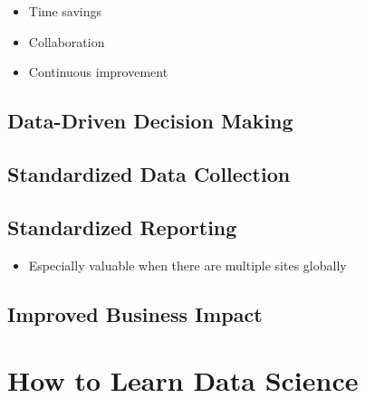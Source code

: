 \documentclass[
]{book}
\providecommand{\tightlist}{%
  \setlength{\itemsep}{0pt}\setlength{\parskip}{0pt}}
\begin{document}
\begin{itemize}
\tightlist
\item
  Time savings
\item
  Collaboration
\item
  Continuous improvement
\end{itemize}

\hypertarget{data-driven-decision-making}{%
\subsection{Data-Driven Decision Making}\label{data-driven-decision-making}}

\hypertarget{standardized-data-collection}{%
\subsection{Standardized Data Collection}\label{standardized-data-collection}}

\hypertarget{standardized-reporting}{%
\subsection{Standardized Reporting}\label{standardized-reporting}}

\begin{itemize}
\tightlist
\item
  Especially valuable when there are multiple sites globally
\end{itemize}

\hypertarget{improved-business-impact}{%
\subsection{Improved Business Impact}\label{improved-business-impact}}

\hypertarget{how-to-learn-data-science}{%
\section{How to Learn Data Science}\label{how-to-learn-data-science}}
\end{document}
